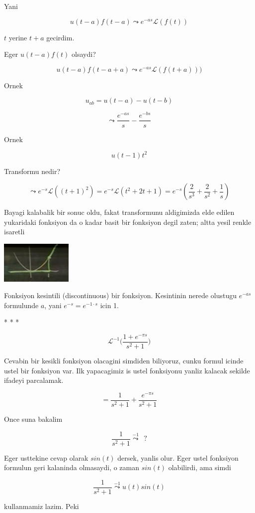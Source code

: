 \documentclass[12pt,fleqn]{article}\usepackage{../common}
\begin{document}
Yani

\[ u(t-a)f(t-a) \leadsto e^{-as}\mathcal{L}(f(t)) \]

$t$ yerine $t+a$ gecirdim.

Eger $u(t-a)f(t)$ olsaydi?

\[ u(t-a)f(t-a+a) \leadsto e^{-as}\mathcal{L}(f(t+a))) \]

Ornek 

\[ u_{ab} = u(t-a) - u(t-b) \]

\[ \leadsto \frac{e^{-as}}{s} - \frac{e^{-bs}}{s} \]

Ornek

\[ u(t-1)t^2 \]

Transformu nedir? 

\[ \leadsto e^{-s}\mathcal{L}((t+1)^2) = 
e^{-s}\mathcal{L} (t^2+2t+1) =
e^{-s}(\frac{2}{s^3} + \frac{2}{s^2} + \frac{1}{s})
 \]

Bayagi kalabalik bir sonuc oldu, fakat transformunu aldigimizda elde edilen
yukaridaki fonksiyon da o kadar basit bir fonksiyon degil zaten; altta
yesil renkle isaretli 

\includegraphics[height=2cm]{22_9.png}

Fonksiyon kesintili (discontinuous) bir fonksiyon. Kesintinin nerede
olustugu $e^{-as}$ formulunde $a$, yani $e^{-s} = e^{-1\cdot s}$ icin 1. 

* * *

\[ \mathcal{L}^{-1}\bigg( \frac{1+e^{-\pi s}}{s^2+1} \bigg) \]

Cevabin bir kesikli fonksiyon olacagini simdiden biliyoruz, cunku formul
icinde ustel bir fonksiyon var. Ilk yapacagimiz is ustel fonksiyonu yanliz
kalacak sekilde ifadeyi parcalamak. 

\[ = \frac{1}{s^2+1} + \frac{e^{-\pi s}}{s^2 + 1}\]

Once suna bakalim

\[ \frac{1}{s^2+1} \stackrel{-1}{\leadsto}  \ \ ? \]

Eger usttekine cevap olarak $sin(t)$ dersek, yanlis olur. Eger ustel
fonksiyon formulun geri kalaninda olmasaydi, o zaman $sin(t)$ olabilirdi,
ama simdi 

\[ \frac{1}{s^2+1} \stackrel{-1}{\leadsto} u(t)sin(t) \]

kullanmamiz lazim. Peki
\end{document}
